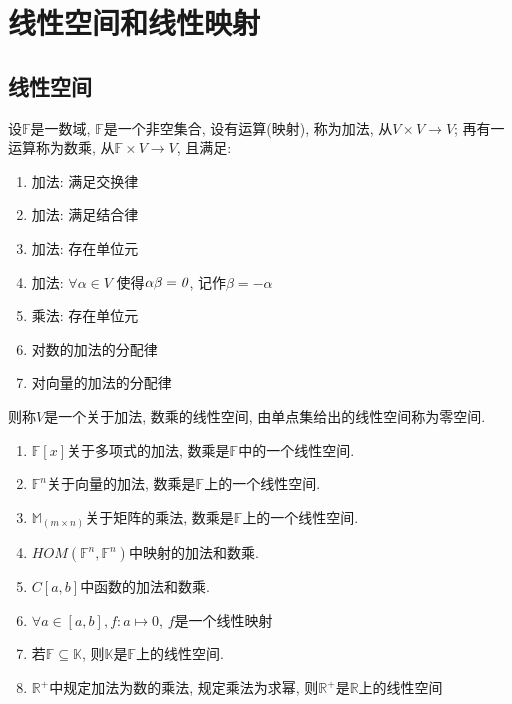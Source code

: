 
\chapter{ 线性空间和线性映射 }
\label{chap:Linear Space and Linear Map}

\section{ 线性空间 }

\begin{definition}[线性空间]
设$\mathbb{F}$是一数域, $\mathbb{F}$是一个非空集合, 设有运算(映射), 称为加法, 从$V \times V \to V$; 再有一运算称为数乘, 从$\mathbb{F} \times V \to V$, 且满足:
\begin{enumerate}[itemindent=1em]
    \item 加法: 满足交换律
    \item 加法: 满足结合律
    \item 加法: 存在单位元
    \item 加法: $\forall \alpha \in V$ 使得$\alpha \beta = \emph{0}$, 记作$\beta = -\alpha$
    \item 乘法: 存在单位元
    \item 对数的加法的分配律
    \item 对向量的加法的分配律
\end{enumerate}
则称$V$是一个关于加法, 数乘的线性空间, 由单点集给出的线性空间称为零空间.
\end{definition}

\begin{example}
    \par
    \begin{enumerate}[itemindent=1em]
        \item $\mathbb{F}[x]$关于多项式的加法, 数乘是$\mathbb{F}$中的一个线性空间.
        \item $\mathbb{F}^n$关于向量的加法, 数乘是$\mathbb{F}$上的一个线性空间.
        \item $\mathbb{M}_(m \times n)$关于矩阵的乘法, 数乘是$\mathbb{F}$上的一个线性空间.
        \item $HOM(\mathbb{F}^n, \mathbb{F}^n)$中映射的加法和数乘.
        \item $C[a, b]$中函数的加法和数乘.
        \item $\forall a \in [a, b], f: a \mapsto 0 $, $f$是一个线性映射
        \item 若$\mathbb{F} \subseteq \mathbb{K}$, 则$\mathbb{K}$是$\mathbb{F}$上的线性空间.
        \item $\mathbb{R}^+$中规定加法为数的乘法, 规定乘法为求幂, 则$\mathbb{R}^+$是$\mathbb{R}$上的线性空间
    \end{enumerate}
\end{example}

